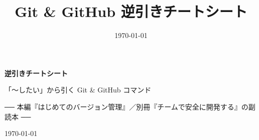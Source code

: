 \documentclass[book, paper=a4, fontsize=10.5pt, titlepage]{jlreq}
\title{Git \& GitHub 逆引きチートシート}
\author{}
\date{\today}
\begin{document}
\begin{titlepage}
  \centering
  \vspace*{4cm}
  {\sffamily\bfseries\Huge 逆引きチートシート\par}
  \vspace{1.2cm}
  {\sffamily\Large 「〜したい」から引く Git \& GitHub コマンド\par}
  \vspace{0.6cm}
  {\sffamily\normalsize ── 本編『はじめてのバージョン管理』／別冊『チームで安全に開発する』の副読本 ──\par}
  \vfill
  {\large \today\par}
\end{titlepage}

\tableofcontents
\clearpage


\end{document}
